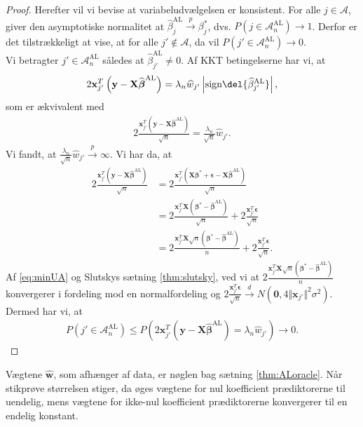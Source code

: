 \begin{proof}
Herefter vil vi bevise at variabeludvælgelsen er konsistent. For alle $j \in \mathcal{A}$, giver den asymptotiske normalitet at $\widehat{\beta}_j^{\text{AL}} \overset{p}{\rightarrow}\beta_j^{*}$, dvs. $P(j \in \mathcal{A}_n^{\text{AL}}) \rightarrow 1$. Derfor er det tilstrækkeligt at vise, at for alle $j' \notin \mathcal{A}$, da vil $P(j' \in \mathcal{A}_n^{\text{AL}}) \rightarrow 0$. \\
Vi betragter $j' \in \mathcal{A}_n^{\text{AL}}$ således at $\widehat{\beta}_{j'}^{\text{AL}} \neq 0$. Af KKT betingelserne har vi, at 
\begin{align*}
2 \mathbf{x}_{j'}^T  \left( \mathbf{y}-\mathbf{X}\widehat{\boldsymbol{\beta}}^{\text{AL}} \right)=\lambda_n \widehat{w}_{j'} \left\vert \text{sign} \del{\widehat{\beta}_{j'}^\text{AL}} \right\vert,
\end{align*}
som er ækvivalent med
\begin{align*}
2 \frac{\mathbf{x}_{j'}^T \left( \mathbf{y}-\mathbf{X}\widehat{\boldsymbol{\beta}}^{{\text{AL}}}\right)}{\sqrt{n}}=\frac{\lambda_n}{\sqrt{n}} \widehat{w}_{j'}.
\end{align*}
Vi fandt, at $\frac{\lambda_n}{\sqrt{n}} \widehat{w}_{j'} \overset{p}{\rightarrow} \infty$. Vi har da, at 
\begin{align*}
2 \frac{\mathbf{x}_{j'}^T \left(\mathbf{y}-\mathbf{X}\widehat{\boldsymbol{\beta}}^{{\text{AL}}} \right)}{\sqrt{n}}
 &= 2 \frac{\mathbf{x}_{j'}^T \left(\mathbf{X}\boldsymbol{\beta}^*+\boldsymbol{\epsilon}-\mathbf{X}\widehat{\boldsymbol{\beta}}^{{\text{AL}}} \right) }{\sqrt{n}} \\
&= 2 \frac{\mathbf{x}_{j'}^T \mathbf{X} \left(\boldsymbol{\beta}^*-\widehat{\boldsymbol{\beta}}^{\text{AL}} \right)}{\sqrt{n}}+2\frac{\mathbf{x}_{j'}^T \boldsymbol{\epsilon}}{\sqrt{n}} \\
&= 2 \frac{\mathbf{x}_{j'}^T \mathbf{X} \sqrt{n} \left(\boldsymbol{\beta}^*-\widehat{\boldsymbol{\beta}}^{\text{AL}}\right)}{n}+2\frac{\mathbf{x}_{j'}^T \boldsymbol{\epsilon}}{\sqrt{n}}.
\end{align*}
Af \eqref{eq:minUA} og Slutskys sætning \ref{thm:slutsky}, ved vi at $ 2 \frac{\mathbf{x}_{j'}^T \mathbf{X} \sqrt{n} \left(\boldsymbol{\beta}^*-\widehat{\boldsymbol{\beta}}^{\text{AL}}\right)}{n}$ konvergerer i fordeling mod en normalfordeling og $2\frac{\mathbf{x}_{j'}^T \boldsymbol{\epsilon}}{\sqrt{n}} \overset{d}{\rightarrow} N \left(\mathbf{0}, 4 \Vert \mathbf{x}_{j'} \Vert^2 \sigma^2 \right)$. Dermed har vi, at
\begin{align*}
P\left(j' \in \mathcal{A}_n^{\text{AL}}\right) \leq P\left(2 \mathbf{x}_{j'}^T \left(\mathbf{y}-\mathbf{X} \widehat{\boldsymbol{\beta}}^{\text{AL}}\right)=\lambda_n \widehat{w}_{j'} \right) \rightarrow 0.
\end{align*}
\end{proof}
%
Vægtene \(\widehat{\mathbf{w}}\), som afhænger af data, er nøglen bag sætning \ref{thm:ALoracle}.
Når stikprøve størrelsen stiger, da øges vægtene for nul koefficient prædiktorerne til uendelig, mens vægtene for ikke-nul koefficient prædiktorerne konvergerer til en endelig konstant.


